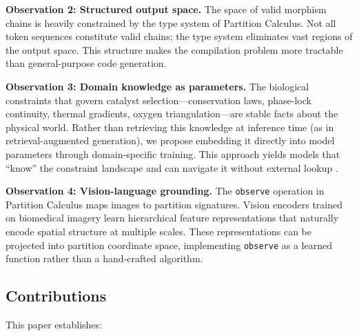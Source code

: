 \documentclass[11pt,a4paper]{article}
\theoremstyle{definition}
\theoremstyle{remark}
\begin{document}
\textbf{Observation 2: Structured output space.} The space of valid morphism chains is heavily constrained by the type system of Partition Calculus. Not all token sequences constitute valid chains; the type system eliminates vast regions of the output space. This structure makes the compilation problem more tractable than general-purpose code generation.

\textbf{Observation 3: Domain knowledge as parameters.} The biological constraints that govern catalyst selection---conservation laws, phase-lock continuity, thermal gradients, oxygen triangulation---are stable facts about the physical world. Rather than retrieving this knowledge at inference time (as in retrieval-augmented generation), we propose embedding it directly into model parameters through domain-specific training. This approach yields models that ``know'' the constraint landscape and can navigate it without external lookup \cite{purpose2024}.

\textbf{Observation 4: Vision-language grounding.} The \texttt{observe} operation in Partition Calculus maps images to partition signatures. Vision encoders trained on biomedical imagery learn hierarchical feature representations that naturally encode spatial structure at multiple scales. These representations can be projected into partition coordinate space, implementing \texttt{observe} as a learned function rather than a hand-crafted algorithm.

\subsection{Contributions}

This paper establishes:
\end{document}
